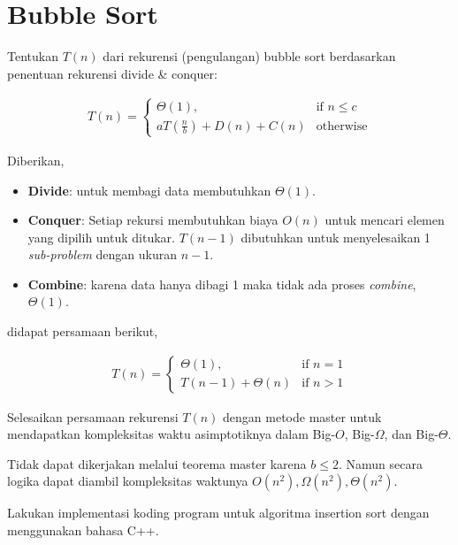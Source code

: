 \section{Bubble Sort}

\Problem Tentukan $T(n)$ dari rekurensi (pengulangan) bubble sort berdasarkan penentuan rekurensi divide \& conquer:

\begin{align*}
    T(n) =
        \begin{cases}
            \Theta(1),                      & \text{if } n \leq c \\
            aT(\frac{n}{b}) + D(n) + C(n)   & \text{otherwise}
        \end{cases}
\end{align*}

\TheSolution
Diberikan,

\begin{itemize}
    \item \textbf{Divide}: untuk membagi data membutuhkan $\Theta(1)$.
    \item \textbf{Conquer}: Setiap rekursi membutuhkan biaya $O(n)$ untuk mencari elemen yang dipilih untuk ditukar. $T(n - 1)$ dibutuhkan untuk menyelesaikan 1 \textit{sub-problem} dengan ukuran $n - 1$.
    \item \textbf{Combine}: karena data hanya dibagi 1 maka tidak ada proses \textit{combine}, $\Theta(1)$.
\end{itemize}

didapat persamaan berikut,

\begin{align*}
    T(n) =
        \begin{cases}
            \Theta(1),              & \text{if } n = 1 \\
            T(n - 1) + \Theta(n)    & \text{if } n > 1                
        \end{cases}
\end{align*}

\Problem Selesaikan persamaan rekurensi $T(n)$ dengan metode master untuk mendapatkan
kompleksitas waktu asimptotiknya dalam Big-$O$, Big-$\Omega$, dan Big-$\Theta$.

\TheSolution

Tidak dapat dikerjakan melalui teorema master karena $b \leq 2$. Namun secara logika dapat diambil kompleksitas waktunya $O(n^2), \Omega(n^2), \Theta(n^2)$.


\Problem Lakukan implementasi koding program untuk algoritma insertion sort dengan menggunakan bahasa C++.

